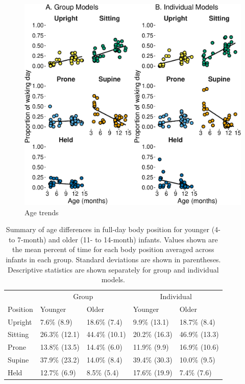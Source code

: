 \documentclass[
  man]{apa6}
\begin{document}
\begin{figure}

{\centering \includegraphics{manuscript_files/figure-latex/age-1} 

}

\caption{Age trends}\label{fig:age}
\end{figure}

\begin{table}[tbp]

\begin{center}
\begin{threeparttable}

\caption{\label{tab:agetable}Summary of age differences in full-day body position for younger (4- to 7-month) and older (11- to 14-month) infants. Values shown are the mean percent of time for each body position averaged across infants in each group. Standard deviations are shown in parentheses. Descriptive statistics are shown separately for group and individual models.}

\begin{tabular}{lllll}
\toprule
 & \multicolumn{2}{c}{Group} & \multicolumn{2}{c}{Individual} \\
\cmidrule(r){2-3} \cmidrule(r){4-5}
Position & Younger & Older & Younger & Older\\
\midrule
Upright & 7.6\% (8.9) & 18.6\% (7.4) & 9.9\% (13.1) & 18.7\% (8.4)\\
Sitting & 26.3\% (12.1) & 44.4\% (10.1) & 20.2\% (16.3) & 46.9\% (13.3)\\
Prone & 13.8\% (13.5) & 14.4\% (6.0) & 11.9\% (9.9) & 16.9\% (10.6)\\
Supine & 37.9\% (23.2) & 14.0\% (8.4) & 39.4\% (30.3) & 10.0\% (9.5)\\
Held & 12.7\% (6.9) & 8.5\% (5.4) & 17.6\% (19.9) & 7.4\% (7.6)\\
\bottomrule
\end{tabular}

\end{threeparttable}
\end{center}

\end{table}
\end{document}
